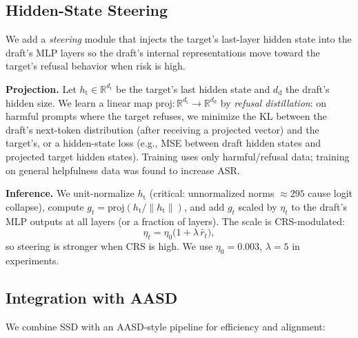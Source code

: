 \documentclass[11pt,a4paper]{article}
\begin{document}
\subsection{Hidden-State Steering}
\label{sec:steering}

We add a \emph{steering} module that injects the target's last-layer hidden state into the draft's MLP layers so the draft's internal representations move toward the target's refusal behavior when risk is high.

\textbf{Projection.} Let $h_{\mathrm{t}} \in \mathbb{R}^{d_{\mathrm{t}}}$ be the target's last hidden state and $d_{\mathrm{d}}$ the draft's hidden size. We learn a linear map $\mathrm{proj}: \mathbb{R}^{d_{\mathrm{t}}} \to \mathbb{R}^{d_{\mathrm{d}}}$ by \emph{refusal distillation}: on harmful prompts where the target refuses, we minimize the KL between the draft's next-token distribution (after receiving a projected vector) and the target's, or a hidden-state loss (e.g., MSE between draft hidden states and projected target hidden states). Training uses only harmful/refusal data; training on general helpfulness data was found to increase ASR.

\textbf{Inference.} We unit-normalize $h_{\mathrm{t}}$ (critical: unnormalized norms $\approx 295$ cause logit collapse), compute $g_t = \mathrm{proj}(h_{\mathrm{t}}/\|h_{\mathrm{t}}\|)$, and add $g_t$ scaled by $\eta_t$ to the draft's MLP outputs at all layers (or a fraction of layers). The scale is CRS-modulated:
\begin{equation}
  \eta_t = \eta_0 \bigl(1 + \lambda \,\bar{r}_t\bigr),
\end{equation}
so steering is stronger when CRS is high. We use $\eta_0 = 0.003$, $\lambda = 5$ in experiments.

\subsection{Integration with AASD}
\label{sec:aasd}

We combine SSD with an AASD-style pipeline for efficiency and alignment:
\end{document}
